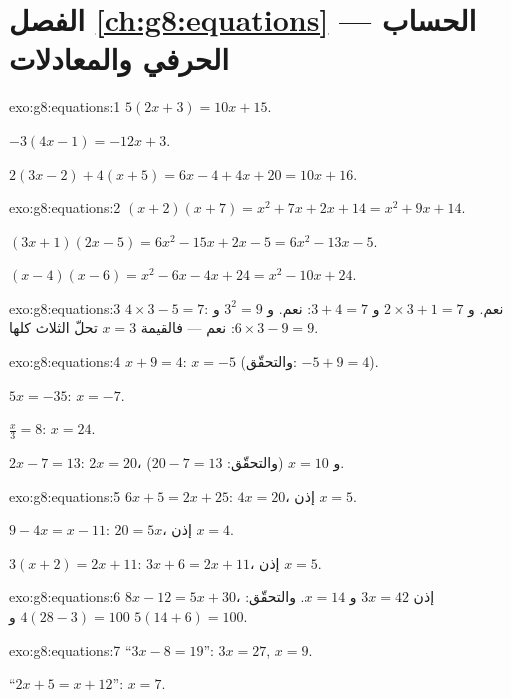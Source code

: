 \section*{الفصل \ref{ch:g8:equations} --- الحساب الحرفي والمعادلات}

\begin{solution}{exo:g8:equations:1}
$5(2x + 3) = 10x + 15$.

$-3(4x - 1) = -12x + 3$.

$2(3x - 2) + 4(x + 5) = 6x - 4 + 4x + 20 = 10x + 16$.
\end{solution}

\begin{solution}{exo:g8:equations:2}
$(x+2)(x+7) = x^2 + 7x + 2x + 14 = x^2 + 9x + 14$.

$(3x+1)(2x-5) = 6x^2 - 15x + 2x - 5 = 6x^2 - 13x - 5$.

$(x-4)(x-6) = x^2 - 6x - 4x + 24 = x^2 - 10x + 24$.
\end{solution}

\begin{solution}{exo:g8:equations:3}
$4 \times 3 - 5 = 7$: نعم. \quad
و $2 \times 3 + 1 = 7$ و $3 + 4 = 7$: نعم. \quad
و $3^2 = 9$ و $6 \times 3 - 9 = 9$: نعم --- فالقيمة $x = 3$ تحلّ الثلاث
كلها.
\end{solution}

\begin{solution}{exo:g8:equations:4}
$x + 9 = 4$: $x = -5$ (والتحقّق: $-5 + 9 = 4$).

$5x = -35$: $x = -7$.

$\frac x3 = 8$: $x = 24$.

$2x - 7 = 13$: $2x = 20$، و $x = 10$ (والتحقّق: $20 - 7 = 13$).
\end{solution}

\begin{solution}{exo:g8:equations:5}
$6x + 5 = 2x + 25$: $4x = 20$، إذن $x = 5$.

$9 - 4x = x - 11$: $20 = 5x$، إذن $x = 4$.

$3(x + 2) = 2x + 11$: $3x + 6 = 2x + 11$، إذن $x = 5$.
\end{solution}

\begin{solution}{exo:g8:equations:6}
$8x - 12 = 5x + 30$، إذن $3x = 42$ و $x = 14$. والتحقّق:
$4(28 - 3) = 100$ و $5(14 + 6) = 100$.
\end{solution}

\begin{solution}{exo:g8:equations:7}
``$3x - 8 = 19$'': $3x = 27$, $x = 9$.

``$2x + 5 = x + 12$'': $x = 7$.
\end{solution}

